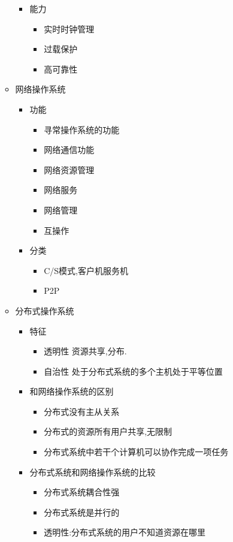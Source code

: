 \documentclass[a4paper,10pt,notitlepage]{article}
\begin{document}
\begin{itemize}
\begin{itemize}
\begin{itemize}
			\item 能力
			\begin{itemize}
				\item 实时时钟管理
				\item 过载保护
				\item 高可靠性
			\end{itemize}
		\end{itemize}
		\item 网络操作系统
		\begin{itemize}
			\item 功能
			\begin{itemize}
				\item 寻常操作系统的功能
				\item 网络通信功能
				\item 网络资源管理
				\item 网络服务
				\item 网络管理
				\item 互操作
			\end{itemize}
			\item 分类
			\begin{itemize}
				\item C/S模式,客户机服务机
				\item P2P
			\end{itemize}
		\end{itemize}
		\item 分布式操作系统
		\begin{itemize}
			\item 特征
			\begin{itemize}
				\item 透明性 资源共享,分布.
				\item 自治性 处于分布式系统的多个主机处于平等位置
			\end{itemize}
			\item 和网络操作系统的区别
			\begin{itemize}
				\item 分布式没有主从关系
				\item 分布式的资源所有用户共享,无限制
				\item 分布式系统中若干个计算机可以协作完成一项任务
			\end{itemize}
			\item 分布式系统和网络操作系统的比较
			\begin{itemize}
				\item 分布式系统耦合性强
				\item 分布式系统是并行的
				\item 透明性:分布式系统的用户不知道资源在哪里

\end{itemize}
\end{itemize}
\end{itemize}
\end{itemize}
\end{document}
